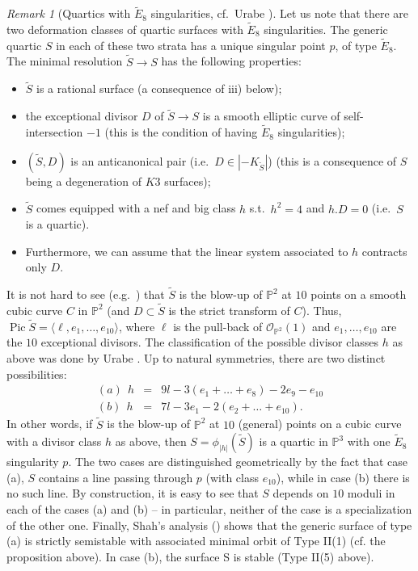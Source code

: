 \documentclass[11pt]{amsart}
\numberwithin{equation}{section}
\theoremstyle{plain}
\theoremstyle{remark}
\newtheorem{remark}[theorem]{Remark}
\theoremstyle{definition}
\def\Pic{\operatorname{Pic}}
\newcommand{\bP}{\mathbb{P}}
\newcommand{\calO}{\mathcal{O}}
\begin{document}
 \begin{remark}[{Quartics with $\widetilde E_8$ singularities, cf.~Urabe \cite{urabee12}}]\label{rmk:e8tildecase}
 Let us note that there are two deformation classes of quartic surfaces with $\widetilde E_8$ singularities. The generic quartic $S$  in each of these two strata  has a unique singular point $p$, of type $\widetilde E_8$. The minimal resolution $\widetilde S\to S$ has the following properties:
 \begin{itemize}
 \item[i)] $\widetilde S$ is a rational surface (a consequence of iii) below);
 \item[ii)] the exceptional divisor $D$ of $\widetilde S\to S$ is a smooth elliptic curve of self-intersection $-1$ (this is the condition of having $\widetilde E_8$ singularities);
 \item[iii)] $(\widetilde S, D)$ is an anticanonical pair (i.e.~$D\in |-K_{\widetilde S}|$) (this is a consequence of $S$ being a degeneration of $K3$ surfaces);
 \item[iv)] $\widetilde S$ comes equipped with a nef and big class $h$ s.t.~$h^2=4$ and $h.D=0$ (i.e.~$S$ is a quartic). 
 \item[v)] Furthermore, we can assume that the linear system associated to $h$ contracts only $D$.
 \end{itemize}
 It is not hard to see (e.g.~\cite[Prop.~1.5]{urabee12}) that $\widetilde S$ is the blow-up of $\bP^2$ at $10$ points on a smooth cubic curve $C$ in $\bP^2$ (and  $D\subset \widetilde S$ is the strict transform of $C$). Thus, $\Pic \widetilde S=\langle \ell, e_1,\dots, e_{10}\rangle$, where $\ell$ is the pull-back of $\calO_{\bP^2}(1)$ and $e_1,\dots, e_{10}$ are the $10$ exceptional divisors. The classification of the possible divisor classes $h$ as above was done by Urabe \cite[Prop.~4.3]{urabee12}. Up to natural symmetries, there are two distinct possibilities:
 \begin{eqnarray*}
 (a)\ \ h&=&9l-3(e_1+\dots+e_8)-2e_9-e_{10}\\
(b)\ \  h&=&7l-3e_1-2(e_2+\dots+e_{10}).
 \end{eqnarray*}
 In other words, if $\widetilde S$ is the blow-up  of $\bP^2$ at $10$ (general) points on a cubic curve with a divisor class $h$ as above, then  $S=\phi_{|h|}(\widetilde S)$ is a quartic in $\bP^3$ with one $\widetilde E_{8}$ singularity $p$. The two cases are distinguished geometrically by the fact that  case (a), $S$ contains a line passing through $p$ (with class $e_{10}$), while in case (b) there is no such line. By construction, it is easy to see that $S$ depends on $10$ moduli in each of the cases (a) and (b) -- in particular, neither of the case is a specialization of the other one. 
 Finally,  Shah's analysis (\cite[Theorem 2.4]{shah}) shows that the generic surface of type (a) is strictly semistable with associated minimal orbit of Type II(1) (cf. the proposition above). In  case (b), the surface S is stable (Type II(5) above). 
 \end{remark}
\end{document}
